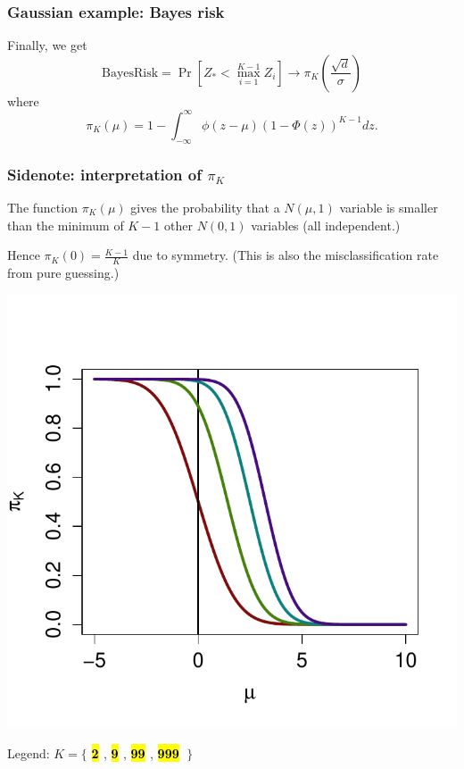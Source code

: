 \documentclass{beamer}
\makeatletter
\newcommand\SoulColor{%
  \let\set@color\beamerorig@set@color
  \let\reset@color\beamerorig@reset@color}
\makeatother
\begin{document}
\begin{frame}
\frametitle{Gaussian example: Bayes risk}
Finally, we get
\[
\text{BayesRisk} = \Pr[Z_* < \max_{i=1}^{K-1} Z_i] \to \pi_K\left(\frac{\sqrt{d}}{\sigma}\right)
\]
where
\[
\pi_K(\mu) =  1 - \int_{-\infty}^\infty \phi(z-\mu) (1-\Phi(z))^{K-1} dz.
\]
\end{frame}

\begin{frame}
\frametitle{Sidenote: interpretation of $\pi_K$}

The function $\pi_K(\mu)$ gives the probability that a $N(\mu, 1)$
variable is smaller than the minimum of $K-1$ other $N(0, 1)$ variables
(all independent.)

Hence $\pi_K(0) = \frac{K-1}{K}$ due to symmetry.  (This is also the misclassification rate from pure guessing.)

\begin{center}

\includegraphics[scale = 0.5, clip=true, trim=0 0.2in 0 0.5in]{../info_theory_sims/illus_piK.pdf}

Legend: $K = \{$
\textbf{\textcolor{white}{\SoulColor\hl{ 2 }}}, 
\textbf{\textcolor{white}{\SoulColor\hl{ 9 }}},
\textbf{\textcolor{white}{\SoulColor\hl{ 99 }}},
\textbf{\textcolor{white}{\SoulColor\hl{ 999 }}}$\ \}$
\end{center}

\end{frame}
\end{document}
